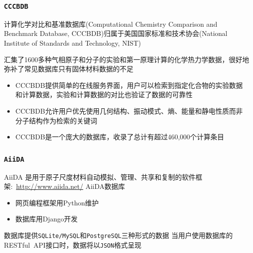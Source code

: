 \frame
{
\frametitle{\texttt{CCCBDB}}
计算化学对比和基准数据库\textrm{(Computational Chemistry Comparison and Benchmark Database, CCCBDB)}归属于美国国家标准和技术协会(\textrm{National Institute of Standards and Technology, NIST})

汇集了\textrm{1600}多种气相原子和分子的实验和第一原理计算的化学热力学数据，很好地弥补了常见数据库只有固体材料数据的不足

\begin{itemize}
	\item \textrm{CCCBDB}提供简单的在线服务界面，用户可以检索到指定化合物的实验数据和计算数据，实验和计算数据的对比也验证了数据的可靠性
	\item \textrm{CCCBDB}允许用户优先使用几何结构、振动模式、熵、能量和静电性质而非分子结构作为检索的关键词\\
		{\fontsize{7.5pt}{4.2pt}\selectfont{避免引入复杂的筛选组合，方便用户快速得到检索结果}}
	\item \textrm{CCCBDB}是一个庞大的数据库，收录了总计有超过\textrm{460,000}个计算条目\\
{\fontsize{7.5pt}{4.2pt}\selectfont{因为其没有开源，降低了数据库的影响力}}
\end{itemize}
}

\frame
{
\frametitle{\tt{AiiDA}}
\textrm{AiiDA}%
是用于原子尺度材料自动模拟、管理、共享和复制的软件框架:~\url{http://www.aiida.net/}
\vskip3pt
{\fontsize{8.0pt}{4.2pt}}
\vskip 3pt
\textrm{AiiDA}数据库
\begin{itemize}
	\item 网页编程框架用\textrm{Python}维护
	\item 数据库用\textrm{Django}开发\\%
		{\fontsize{7.0pt}{4.2pt}\selectfont{可满足计算物理、化学和材料科学研究的多种不同需求}}
\end{itemize}
数据库提供\texttt{SQLite/MySQL}和\texttt{PostgreSQL}三种形式的数据
\vskip 3pt
{\fontsize{8.0pt}{4.2pt}}
\vskip 5pt
当用户使用数据库的\textrm{RESTful~API}接口时，数据将以\texttt{JSON}格式呈现
}

